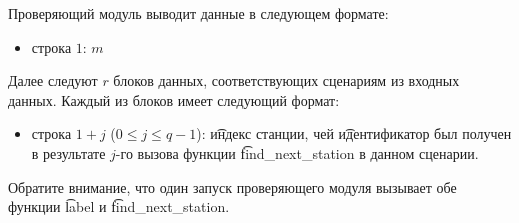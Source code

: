 Проверяющий модуль выводит данные в следующем формате:
\begin{itemize}
\item строка $1$: $m$
\end{itemize}

Далее следуют $r$ блоков данных, соответствующих сценариям из входных данных. Каждый из блоков имеет следующий формат:
\begin{itemize}
\item строка $1 + j$ ($0 \leq j \leq q - 1$): \t{индекс} станции, чей \t{идентификатор} был получен в результате $j$-го вызова функции \t{find\_next\_station} в данном сценарии.
\end{itemize}

Обратите внимание, что один запуск проверяющего модуля вызывает обе функции \t{label} и \t{find\_next\_station}.